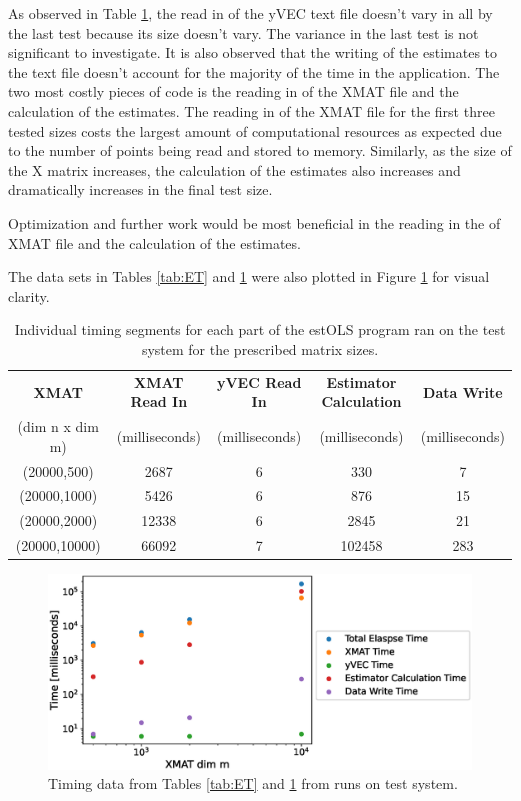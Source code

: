 \documentclass{article}
\begin{document}
As observed in Table \ref{tab:ETBreakdown}, the read in of the yVEC text file doesn't vary in all by the last test because its size doesn't vary. The variance in the last test is not significant to investigate. It is also observed that the writing of the estimates to the text file doesn't account for the majority of the time in the application. The two most costly pieces of code is the reading in of the XMAT file and the calculation of the estimates. The reading in of the XMAT file for the first three tested sizes costs the largest amount of computational resources as expected due to the number of points being read and stored to memory. Similarly, as the size of the X matrix increases, the calculation of the estimates also increases and dramatically increases in the final test size. 

Optimization and further work would be most beneficial in the reading in the of XMAT file and the calculation of the estimates.

The data sets in Tables \ref{tab:ET} and \ref{tab:ETBreakdown} were also plotted in Figure \ref{fig:Timing} for visual clarity. 

\begin{table}[H]
	\centering
	\begin{tabular}{ |c||c|c|c|c|} 
		\hline
		\textbf{XMAT} & \textbf{XMAT Read In} & \textbf{yVEC Read In} & \textbf{Estimator Calculation} & \textbf{Data Write} \\ 
		(dim n x dim m) & (milliseconds) & (milliseconds) & (milliseconds) & (milliseconds)\\
		\hline
		\hline
		(20000,500) & 2687  & 6 & 330  & 7 \\ 
		\hline		
		(20000,1000) & 5426  & 6 & 876 & 15 \\ 
		\hline		
		(20000,2000) & 12338  & 6 & 2845 & 21 \\ 
		\hline
		(20000,10000) & 66092  & 7 & 102458 & 283 \\ 
		\hline
	\end{tabular}
	\caption{Individual timing segments for each part of the estOLS program ran on the test system for the prescribed matrix sizes.} \label{tab:ETBreakdown}
\end{table}

\begin{figure}[H]
	\centering
	\includegraphics[scale=0.65]{Timing.eps}
	\caption{Timing data from Tables \ref{tab:ET} and \ref{tab:ETBreakdown} from runs on test system. \label{fig:Timing}}
\end{figure}
\end{document}

